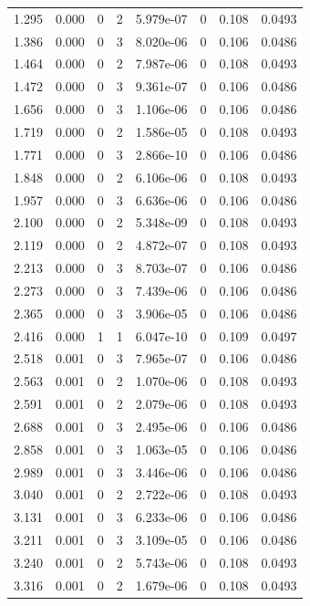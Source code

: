 \documentclass[preview]{standalone}
\begin{document}
{{\begin{tabular}{L{1.2cm}C{1.2cm} C{0.3cm}C{0.5cm} C{1.4cm}C{1.4cm} C{1.4cm}C{1.4cm}}
  1.295  &  0.000  & 0     &  2 &  5.979e-07  & 0  & 0.108 &  0.0493   \\ 
  1.386  &  0.000  & 0     &  3 &  8.020e-06  & 0  & 0.106 &  0.0486   \\ 
  1.464  &  0.000  & 0     &  2 &  7.987e-06  & 0  & 0.108 &  0.0493   \\ 
  1.472  &  0.000  & 0     &  3 &  9.361e-07  & 0  & 0.106 &  0.0486   \\ 
  1.656  &  0.000  & 0     &  3 &  1.106e-06  & 0  & 0.106 &  0.0486   \\ 
  1.719  &  0.000  & 0     &  2 &  1.586e-05  & 0  & 0.108 &  0.0493   \\ 
  1.771  &  0.000  & 0     &  3 &  2.866e-10  & 0  & 0.106 &  0.0486   \\ 
  1.848  &  0.000  & 0     &  2 &  6.106e-06  & 0  & 0.108 &  0.0493   \\ 
  1.957  &  0.000  & 0     &  3 &  6.636e-06  & 0  & 0.106 &  0.0486   \\ 
  2.100  &  0.000  & 0     &  2 &  5.348e-09  & 0  & 0.108 &  0.0493   \\ 
  2.119  &  0.000  & 0     &  2 &  4.872e-07  & 0  & 0.108 &  0.0493   \\ 
  2.213  &  0.000  & 0     &  3 &  8.703e-07  & 0  & 0.106 &  0.0486   \\ 
  2.273  &  0.000  & 0     &  3 &  7.439e-06  & 0  & 0.106 &  0.0486   \\ 
  2.365  &  0.000  & 0     &  3 &  3.906e-05  & 0  & 0.106 &  0.0486   \\ 
  2.416  &  0.000  & 1     &  1 &  6.047e-10  & 0  & 0.109 &  0.0497   \\ 
  2.518  &  0.001  & 0     &  3 &  7.965e-07  & 0  & 0.106 &  0.0486   \\ 
  2.563  &  0.001  & 0     &  2 &  1.070e-06  & 0  & 0.108 &  0.0493   \\ 
  2.591  &  0.001  & 0     &  2 &  2.079e-06  & 0  & 0.108 &  0.0493   \\ 
  2.688  &  0.001  & 0     &  3 &  2.495e-06  & 0  & 0.106 &  0.0486   \\ 
  2.858  &  0.001  & 0     &  3 &  1.063e-05  & 0  & 0.106 &  0.0486   \\ 
  2.989  &  0.001  & 0     &  3 &  3.446e-06  & 0  & 0.106 &  0.0486   \\ 
  3.040  &  0.001  & 0     &  2 &  2.722e-06  & 0  & 0.108 &  0.0493   \\ 
  3.131  &  0.001  & 0     &  3 &  6.233e-06  & 0  & 0.106 &  0.0486   \\ 
  3.211  &  0.001  & 0     &  3 &  3.109e-05  & 0  & 0.106 &  0.0486   \\ 
  3.240  &  0.001  & 0     &  2 &  5.743e-06  & 0  & 0.108 &  0.0493   \\ 
  3.316  &  0.001  & 0     &  2 &  1.679e-06  & 0  & 0.108 &  0.0493   \\ 
\hline 
\end{tabular} 

}}
\end{document}
